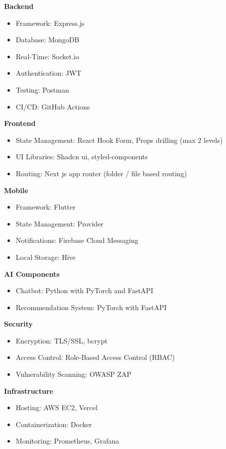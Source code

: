 \textbf{Backend}
\begin{itemize}
    \item Framework: Express.js
    \item Database: MongoDB
    \item Real-Time: Socket.io
    \item Authentication: JWT
    \item Testing: Postman
    \item CI/CD: GitHub Actions
\end{itemize}

\textbf{Frontend}
\begin{itemize}
    \item State Management: React Hook Form, Props drilling (max 2 levels)
    \item UI Libraries: Shadcn ui, styled-components
    \item Routing: Next js app router (folder / file based routing)
\end{itemize}

\textbf{Mobile}
\begin{itemize}
    \item Framework: Flutter
    \item State Management: Provider
    \item Notifications: Firebase Cloud Messaging
    \item Local Storage: Hive
\end{itemize}


\textbf{AI Components}
\begin{itemize}
    \item Chatbot: Python with PyTorch and FastAPI
    \item Recommendation System: PyTorch with FastAPI
\end{itemize}


\textbf{Security}
\begin{itemize}
    \item Encryption: TLS/SSL, bcrypt
    \item Access Control: Role-Based Access Control (RBAC)
    \item Vulnerability Scanning: OWASP ZAP
\end{itemize}

\textbf{Infrastructure}
\begin{itemize}
    \item Hosting: AWS EC2, Vercel
    \item Containerization: Docker
    \item Monitoring: Prometheus, Grafana
\end{itemize}


